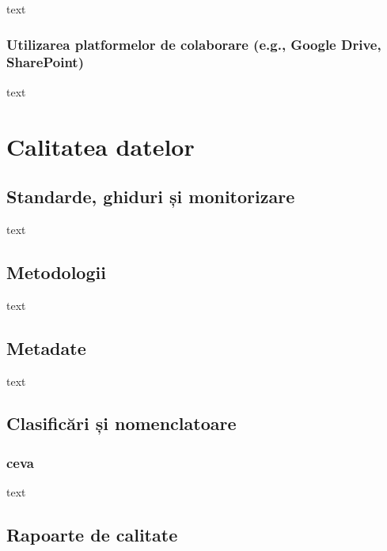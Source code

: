 \documentclass[
  11pt,
  b5paper,
  nottoc]{book}
\begin{document}
text

\hypertarget{utilizarea-platformelor-de-colaborare-e.g.-google-drive-sharepoint}{%
\subsection{Utilizarea platformelor de colaborare (e.g., Google Drive,
SharePoint)}\label{utilizarea-platformelor-de-colaborare-e.g.-google-drive-sharepoint}}

text


\hypertarget{cap9}{%
\chapter{Calitatea datelor}\label{cap9}}

\hypertarget{standarde-ghiduri-ux219i-monitorizare}{%
\section{Standarde, ghiduri și
monitorizare}\label{standarde-ghiduri-ux219i-monitorizare}}

text

\hypertarget{metodologii}{%
\section{Metodologii}\label{metodologii}}

text

\hypertarget{metadate}{%
\section{Metadate}\label{metadate}}

text

\hypertarget{clasificux103ri-ux219i-nomenclatoare}{%
\section{Clasificări și
nomenclatoare}\label{clasificux103ri-ux219i-nomenclatoare}}

\hypertarget{ceva}{%
\subsection{ceva}\label{ceva}}

text

\hypertarget{rapoarte-de-calitate}{%
\section{Rapoarte de calitate}\label{rapoarte-de-calitate}}
\end{document}
